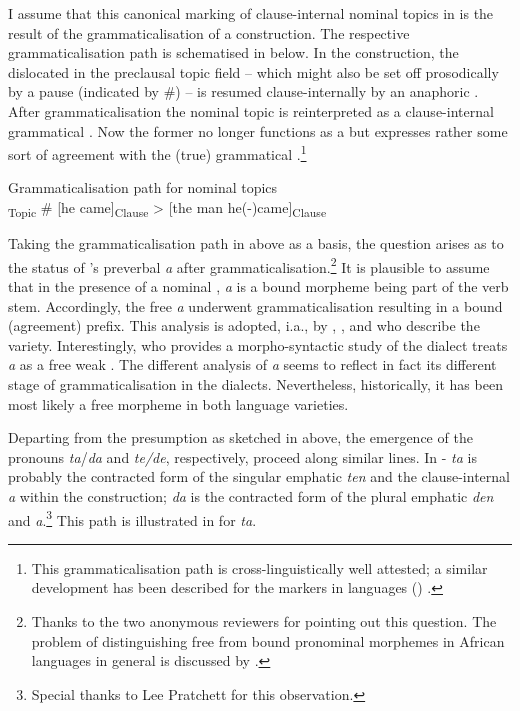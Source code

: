 \documentclass[output=paper
,newtxmath
,modfonts
,nonflat]{langsci/langscibook}
\begin{document}
I assume that this canonical marking of clause-internal nominal  topics in  is the result of the grammaticalisation of a  construction. The respective grammaticalisation path is schematised in  below. In the  construction, the dislocated  in the preclausal topic field -- which might also be set off prosodically by a pause (indicated by \#) -- is resumed clause-internally by an anaphoric . After grammaticalisation the nominal topic is reinterpreted as a clause-internal grammatical . Now the former  no longer functions as a  but expresses rather some sort of agreement with the (true) grammatical .\footnote{This grammaticalisation path is cross-linguistically well attested; a similar development has been described for the  markers in  languages () \citep{Morimoto2008}.}

\ea\label{ex:apel:13}
{Grammaticalisation path for nominal  topics \citep[adapted from][155]{Givon76}}\\
\textsubscript{Topic} \# [he came]\textsubscript{Clause} > [the man he(-)came]\textsubscript{Clause}
\z

Taking the grammaticalisation path in  above as a basis, the question arises as to the status of ’s preverbal \textit{a} after grammaticalisation.\footnote{Thanks to the two anonymous reviewers for pointing out this question. The problem of distinguishing free from bound pronominal morphemes in African languages in general is discussed by \citet{Creissels2005typology}.} It is plausible to assume that in the presence of a nominal , \textit{a} is a bound morpheme being part of the verb stem. Accordingly, the free  \textit{a} underwent grammaticalisation resulting in a bound (agreement) prefix. This analysis is adopted, i.a., by \citet{Renaudier2012}, \citet{Neely2013}, and \citet{Heath2014} who describe the  variety. Interestingly, \citet{Faye1979} who provides a morpho-syntactic study of the  dialect treats \textit{a} as a free weak  \citep[also][]{FayeMous06}. The different analysis of \textit{a} seems to reflect in fact its different stage of grammaticalisation in the dialects. Nevertheless, historically, it has been most likely a free morpheme in both language varieties.    

Departing from the presumption as sketched in  above, the emergence of the  pronouns \textit{ta}/\textit{da} and \textit{te/de}, respectively, proceed along similar lines. In - \textit{ta} is probably the contracted form of the singular emphatic  \textit{ten} and the clause-internal  \textit{a} within the  construction; \textit{da} is the contracted form of the plural emphatic  \textit{den} and \textit{a}.\footnote{Special thanks to Lee Pratchett for this observation.} This path is illustrated in  for \textit{ta}.
\end{document}
